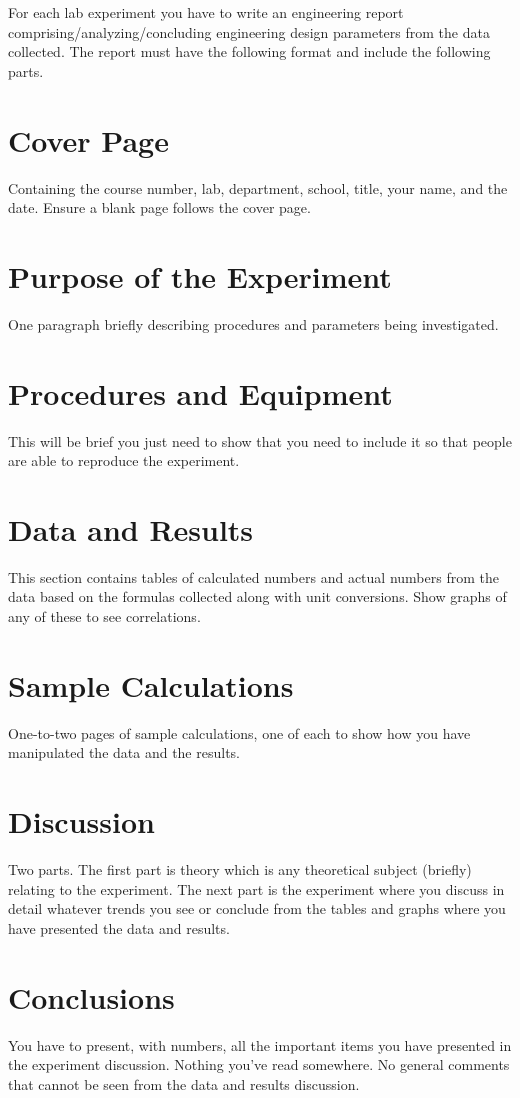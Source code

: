 \documentclass{article}
\begin{document}
For each lab experiment you have to write an engineering report comprising/analyzing/concluding engineering design parameters from the data collected. The report must have the following format and include the following parts.
\section{Cover Page}
    Containing the course number, lab, department, school, title, your name, and the date. Ensure a blank page follows the cover page.
\section{Purpose of the Experiment}
    One paragraph briefly describing procedures and parameters being investigated.
\section{Procedures and Equipment}
    This will be brief you just need to show that you need to include it so that people are able to reproduce the experiment.
\section{Data and Results}
    This section contains tables of calculated numbers and actual numbers from the data based on the formulas collected along with unit conversions. Show graphs of any of these to see correlations.
\section{Sample Calculations}
    One-to-two pages of sample calculations, one of each to show how you have manipulated the data and the results.
\section{Discussion}
    Two parts. The first part is theory which is any theoretical subject (briefly) relating to the experiment. The next part is the experiment where you discuss in detail whatever trends you see or conclude from the tables and graphs where you have presented the data and results.
\section{Conclusions}
    You have to present, with numbers, all the important items you have presented in the experiment discussion. Nothing you've read somewhere. No general comments that cannot be seen from the data and results discussion.
\end{document}
